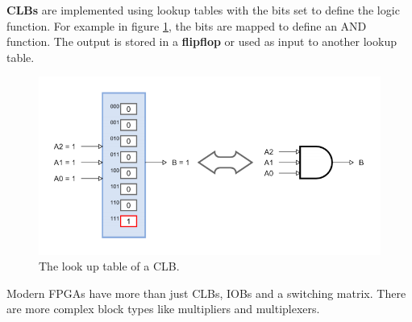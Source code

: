 \documentclass[11pt]{article}
\begin{document}
\n
\textbf{CLBs} are implemented using lookup tables with the bits set to define the logic function. For example in figure \ref{fig:clb}, the bits are mapped to define an AND function. The output is stored in a \textbf{flipflop} or used as input to another lookup table. 
\begin{figure}[H]
\centering
\includegraphics[width=1\textwidth, keepaspectratio]{imgs/clb-lut.png}
\caption{The look up table of a CLB.}
\label{fig:clb}
\end{figure}
\noindent
Modern FPGAs have more than just CLBs, IOBs and a switching matrix. There are more complex block types like multipliers and multiplexers. 
\end{document}
